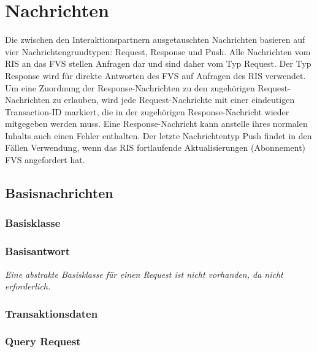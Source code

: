 \chapter{Nachrichten}
\label{cha:Nachrichten}
Die zwischen den Interaktionspartnern ausgetauschten Nachrichten basieren auf vier Nachrichtengrundtypen: Request, Response und Push. Alle Nachrichten vom RIS an das FVS stellen Anfragen dar und sind daher vom Typ Request. Der Typ Response wird für direkte Antworten des FVS auf Anfragen des RIS verwendet. Um eine Zuordnung der Response-Nachrichten zu den zugehörigen Request-Nachrichten zu erlauben, wird jede Request-Nachrichte mit einer eindeutigen Transaction-ID markiert, die in der zugehörigen Response-Nachricht wieder mitgegeben werden muss. Eine Response-Nachricht kann anstelle ihres normalen Inhalts auch einen Fehler enthalten. Der letzte Nachrichtentyp Push findet in den Fällen Verwendung, wenn das RIS fortlaufende Aktualisierungen (Abonnement) FVS angefordert hat. 

\section{Basisnachrichten}
\label{sec:Nachrichten:Basisnachrichten}

\subsection*{Basisklasse}



\subsection*{Basisantwort}


\medskip

\textit{Eine abstrakte Basisklasse für einen Request ist nicht vorhanden, da nicht erforderlich.}

\subsection*{Transaktionsdaten}



\subsection*{Query Request}



